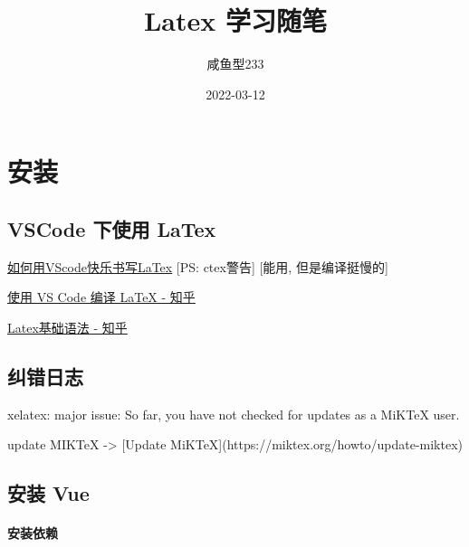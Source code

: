\documentclass[UTF8]{UJSBachelor} %
\title{Latex 学习随笔}
\author{咸鱼型233}
\date{2022-03-12}
\begin{document}
\maketitle  %
\tableofcontents

\section{安装}
\subsection{VSCode 下使用 LaTex}
\href{https://zhuanlan.zhihu.com/p/337813181}{如何用VScode快乐书写LaTex}
[PS: ctex警告] [能用, 但是编译挺慢的]

\href{https://zhuanlan.zhihu.com/p/382472221}{使用 VS Code 编译 LaTeX - 知乎}

\href{https://zhuanlan.zhihu.com/p/52347414}{Latex基础语法 - 知乎}

\subsection{纠错日志}

xelatex: major issue: So far, you have not checked for updates as a MiKTeX user.

update MIKTeX -> [Update MiKTeX](https://miktex.org/howto/update-miktex)


\subsection{安装 Vue}
\paragraph{安装依赖}
\end{document}
